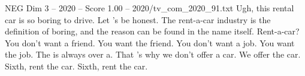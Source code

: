 \begin{textsample}{NEG Dim 3 – 2020 – Score 1.00 – 2020/tv\_com\_2020\_91.txt}  \label{ex:f3_neg_036}
Ugh, this rental car is so boring to drive.
Let 's be honest.
The rent-a-car industry is the definition of boring, and the reason can be found in the name itself.
Rent-a-car?
You don't want a friend.
You want the friend.
You don't want a job.
You want the job.
The is always over a.
That 's why we don't offer a car.
We offer the car.
Sixth, rent the car.
Sixth, rent the car.

\end{textsample}
